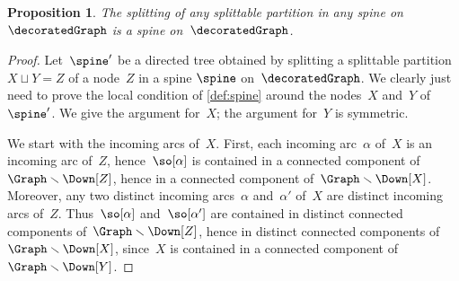 \documentclass{amsart}
\newtheorem{proposition}[theorem]{Proposition}
\theoremstyle{definition}
\newcommand{\ssm}{\smallsetminus} %
\begin{document}
\begin{proposition}
  \label{prop:nodeSplitting} 
  The splitting of any splittable partition in any spine on~$\decoratedGraph$ is a spine on~$\decoratedGraph$.
\end{proposition}

\begin{proof}
  Let~$\spine'$ be a directed tree obtained by splitting a splittable partition~$X \sqcup Y = Z$ of a node~$Z$ in a spine $\spine$ on~$\decoratedGraph$.
  We clearly just need to prove the local condition of \cref{def:spine} around the nodes~$X$ and~$Y$ of~$\spine'$.
  We give the argument for~$X$; the argument for~$Y$ is symmetric.
  
  We start with the incoming arcs of~$X$.
  First, each incoming arc~$\alpha$ of~$X$ is an incoming arc of~$Z$, hence~$\so[\alpha]$ is contained in a connected component of~$\Graph \ssm \Down[Z]$, hence in a connected component of~$\Graph \ssm \Down[X]$.
  Moreover, any two distinct incoming arcs~$\alpha$ and~$\alpha'$ of~$X$ are distinct incoming arcs of~$Z$. Thus~$\so[\alpha]$ and~$\so[\alpha']$ are contained in distinct connected components of~$\Graph \ssm \Down[Z]$, hence in distinct connected components of~$\Graph \ssm \Down[X]$, since~$X$ is contained in a connected component of~$\Graph \ssm \Down[Y]$.


\end{proof}
\end{document}
